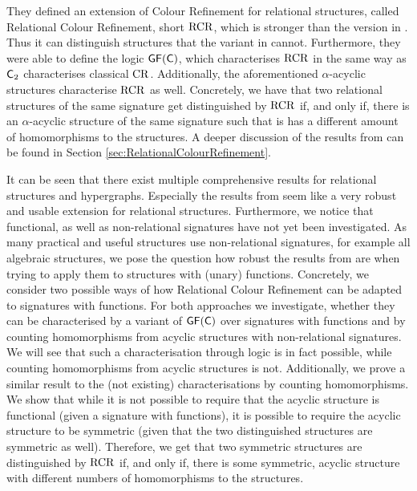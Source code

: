 They defined an extension of Colour Refinement for relational structures, called Relational Colour Refinement, short $\operatorname{RCR}$, which is stronger than the version in \cite{butti2021FractionalHomomorphism}.
Thus it can distinguish structures that the variant in \cite{butti2021FractionalHomomorphism} cannot.
Furthermore, they were able to define the logic $\mathsf{GF}(\mathsf{C})$, which characterises $\operatorname{RCR}$ in the same way as $\mathsf{C}_{2}$ characterises classical $\operatorname{CR}$.
Additionally, the aforementioned $\alpha$-acyclic structures characterise $\operatorname{RCR}$ as well.
Concretely, we have that two relational structures of the same signature get distinguished by $\operatorname{RCR}$ if, and only if, there is an $\alpha$-acyclic structure of the same signature such that is has a different amount of homomorphisms to the structures.
A deeper discussion of the results from \cite{scheidt2025ColorRefinement} can be found in Section \ref{sec:RelationalColourRefinement}.


It can be seen that there exist multiple comprehensive results for relational structures and hypergraphs.
Especially the results from \cite{scheidt2025ColorRefinement} seem like a very robust and usable extension for relational structures.
Furthermore, we notice that functional, as well as non-relational signatures have not yet been investigated.
As many practical and useful structures use non-relational signatures, for example all algebraic structures, we pose the question how robust the results from \cite{scheidt2025ColorRefinement} are when trying to apply them to structures with (unary) functions.
Concretely, we consider two possible ways of how Relational Colour Refinement can be adapted to signatures with functions.
For both approaches we investigate, whether they can be characterised by a variant of $\mathsf{GF}(\mathsf{C})$ over signatures with functions and by counting homomorphisms from acyclic structures with non-relational signatures.
We will see that such a characterisation through logic is in fact possible, while counting homomorphisms from acyclic structures is not.
Additionally, we prove a similar result to the (not existing) characterisations by counting homomorphisms.
We show that while it is not possible to require that the acyclic structure is functional (given a signature with functions), it is possible to require the acyclic structure to be symmetric (given that the two distinguished structures are symmetric as well).
Therefore, we get that two symmetric structures are distinguished by $\operatorname{RCR}$ if, and only if, there is some symmetric, acyclic structure with different numbers of homomorphisms to the structures.

